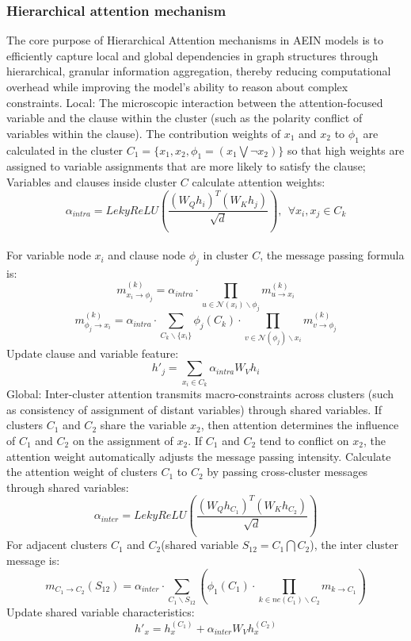 \subsubsection{Hierarchical attention mechanism}
The core purpose of Hierarchical Attention mechanisms in AEIN models is to efficiently capture local and global dependencies in graph structures through hierarchical, granular information aggregation, thereby reducing computational overhead while improving the model's ability to reason about complex constraints.
Local: The microscopic interaction between the attention-focused variable and the clause within the cluster (such as the polarity conflict of variables within the clause).
The contribution weights of \(x_1\) and \(x_2\) to \(\phi_1\) are calculated in the cluster \(C_1=\{x_1,x_2,\phi_1=(x_1\bigvee \lnot x_2)\}\) so that high weights are assigned to variable assignments that are more likely to satisfy the clause;
Variables and clauses inside cluster \(C\) calculate attention weights:
\begin{equation}
\alpha_{intra}=LekyReLU(\frac{(W_Qh_i)^T(W_Kh_j)}{\sqrt{d}}),\ \ \forall x_i,x_j\in C_k
\end{equation}\\
For variable node \(x_i\) and clause node \(\phi_j\) in cluster \(C\), the message passing formula is:
\begin{equation}
    m_{x_i\rightarrow \phi_j}^{(k)}=\alpha_{intra}\cdot \prod_{u\in \mathcal N(x_i)\backslash \phi_j}m_{u\rightarrow x_i}^{(k)}
\end{equation}
\begin{equation}
     m_{\phi_j\rightarrow x_i}^{(k)}=\alpha_{intra}\cdot\sum_{C_k \backslash \{x_i\}}\phi_j(C_k)\cdot\prod_{v\in \mathcal{N}(\phi_j)\backslash x_i}m_{v\rightarrow \phi_j}^{(k)}
\end{equation}
Update clause and variable feature:
\begin{equation}
h'_j=\sum_{x_i\in C_k}\alpha_{intra}W_Vh_i
\end{equation}
Global: Inter-cluster attention transmits macro-constraints across clusters (such as consistency of assignment of distant variables) through shared variables.
If clusters \(C_1\) and \(C_2\) share the variable \(x_2\), then attention determines the influence of \(C_1\) and \(C_2\) on the assignment of \(x_2\). If \(C_1\) and \(C_2\) tend to conflict on \(x_2\), the attention weight automatically adjusts the message passing intensity.
Calculate the attention weight of clusters \(C_1\)  to \(C_2\)  by passing cross-cluster messages through shared variables:
\begin{equation}
\alpha_{inter}=LekyReLU(\frac{(W_Qh_{C_1})^T(W_Kh_{C_2})}{\sqrt{d}})
\end{equation}
For adjacent clusters \(C_1\) and \(C_2\)(shared variable \(S_{12}=C_1\bigcap C_2\)), the inter cluster message is:
\begin{equation}
    m_{C_1\rightarrow C_2}(S_{12})=\alpha_{inter}\cdot\sum_{C_1\backslash S_{12}}(\phi_1(C_1)\cdot\prod_{k\in ne(C_1)\backslash C_2}m_{k\rightarrow C_1})
\end{equation}
Update shared variable characteristics:
\begin{equation}
h'_x=h_x^{(C_1)}+\alpha_{inter}W_Vh_x^{(C_2)}
\end{equation}
